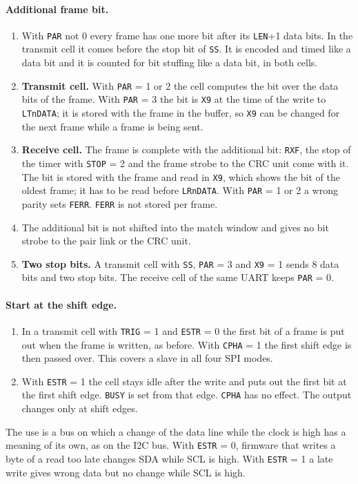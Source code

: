 \documentclass[10pt,a4paper]{article}
\newcommand{\reg}[1]{\texttt{#1}}
\begin{document}
\paragraph{Additional frame bit.}
\begin{enumerate}[label=\textbf{N\arabic*},leftmargin=2.6em]
\item With \reg{PAR} not 0 every frame has one more bit after its \reg{LEN}+1 data bits. In the transmit cell
it comes before the stop bit of \reg{SS}. It is encoded and timed like a data bit and it is counted for bit
stuffing like a data bit, in both cells.
\item \textbf{Transmit cell.} With \reg{PAR} = 1 or 2 the cell computes the bit over the data bits of the frame.
With \reg{PAR} = 3 the bit is \reg{X9} at the time of the write to \reg{LTnDATA}; it is stored with the frame in
the buffer, so \reg{X9} can be changed for the next frame while a frame is being sent.
\item \textbf{Receive cell.} The frame is complete with the additional bit: \reg{RXF}, the stop of the timer with
\reg{STOP} = 2 and the frame strobe to the CRC unit come with it. The bit is stored with the frame and read in
\reg{X9}, which shows the bit of the oldest frame; it has to be read before \reg{LRnDATA}. With \reg{PAR} = 1 or
2 a wrong parity sets \reg{FERR}. \reg{FERR} is not stored per frame.
\item The additional bit is not shifted into the match window and gives no bit strobe to the pair link or
the CRC unit.
\item \textbf{Two stop bits.} A transmit cell with \reg{SS}, \reg{PAR} = 3 and \reg{X9} = 1 sends 8 data bits and two
stop bits. The receive cell of the same UART keeps \reg{PAR} = 0.
\end{enumerate}

\paragraph{Start at the shift edge.}
\begin{enumerate}[label=\textbf{S\arabic*},leftmargin=2.6em]
\item In a transmit cell with \reg{TRIG} = 1 and \reg{ESTR} = 0 the first bit of a frame is put out when the
frame is written, as before. With \reg{CPHA} = 1 the first shift edge is then passed over. This covers a slave
in all four SPI modes.
\item With \reg{ESTR} = 1 the cell stays idle after the write and puts out the first bit at the first shift
edge. \reg{BUSY} is set from that edge. \reg{CPHA} has no effect. The output changes only at shift edges.
\end{enumerate}
The use is a bus on which a change of the data line while the clock is high has a meaning of its own, as on the
I2C bus. With \reg{ESTR} = 0, firmware that writes a byte of a read too late changes SDA while SCL is high. With
\reg{ESTR} = 1 a late write gives wrong data but no change while SCL is high.
\end{document}
